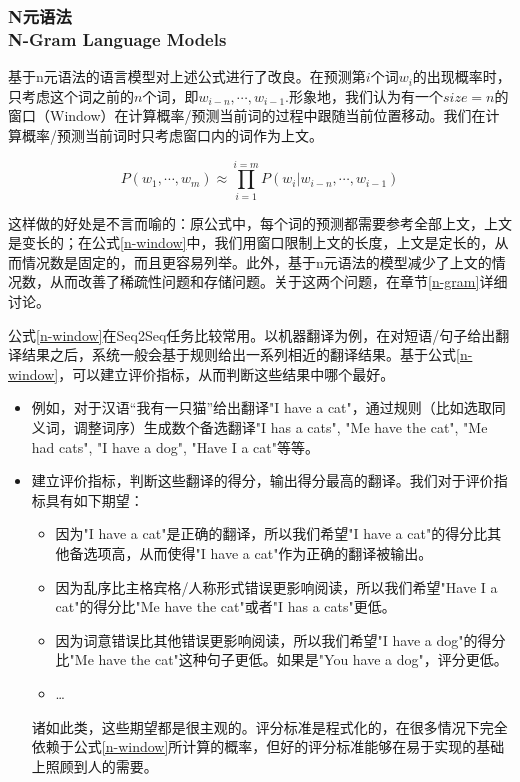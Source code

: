 \subsubsection{N元语法 \\ N-Gram Language Models}

基于n元语法的语言模型对上述公式进行了改良。在预测第$i$个词$w_i$的出现概率时，只考虑这个词之前的$n$个词，即$w_{i-n}, \cdots, w_{i-1}$.形象地，我们认为有一个$size = n$的窗口（Window）在计算概率/预测当前词的过程中跟随当前位置移动。我们在计算概率/预测当前词时只考虑窗口内的词作为上文。

\begin{equation}
\label{n-window}
P(w_1, \cdots, w_m) \approx \prod_{i=1}^{i=m}{P(w_i | w_{i-n}, \cdots, w_{i-1})}
\end{equation}

这样做的好处是不言而喻的：原公式中，每个词的预测都需要参考全部上文，上文是变长的；在公式\ref{n-window}中，我们用窗口限制上文的长度，上文是定长的，从而情况数是固定的，而且更容易列举。此外，基于n元语法的模型减少了上文的情况数，从而改善了稀疏性问题和存储问题。关于这两个问题，在章节\ref{n-gram}详细讨论。

公式\ref{n-window}在Seq2Seq任务比较常用。以机器翻译为例，在对短语/句子给出翻译结果之后，系统一般会基于规则给出一系列相近的翻译结果。基于公式\ref{n-window}，可以建立评价指标，从而判断这些结果中哪个最好。
\begin{itemize}
    \item 例如，对于汉语“我有一只猫”给出翻译"I have a cat"，通过规则（比如选取同义词，调整词序）生成数个备选翻译"I has a cats", "Me have the cat", "Me had cats", "I have a dog", "Have I a cat"等等。
    \item 建立评价指标，判断这些翻译的得分，输出得分最高的翻译。我们对于评价指标具有如下期望：
    \begin{itemize}
        \item 因为"I have a cat"是正确的翻译，所以我们希望"I have a cat"的得分比其他备选项高，从而使得"I have a cat"作为正确的翻译被输出。
        \item 因为乱序比主格宾格/人称形式错误更影响阅读，所以我们希望"Have I a cat"的得分比"Me have the cat"或者"I has a cats"更低。
        \item 因为词意错误比其他错误更影响阅读，所以我们希望"I have a dog"的得分比"Me have the cat"这种句子更低。如果是"You have a dog"，评分更低。
        \item …
    \end{itemize}
    诸如此类，这些期望都是很主观的。评分标准是程式化的，在很多情况下完全依赖于公式\ref{n-window}所计算的概率，但好的评分标准能够在易于实现的基础上照顾到人的需要。
\end{itemize}

